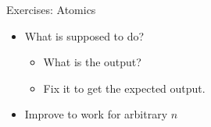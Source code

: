 \documentclass[aspectratio=43]{beamer}
\begin{document}
\begin{frame}[fragile]{Exercises: Atomics}
    \begin{itemize}
        \item What is  supposed to do?
        \begin{itemize}
            \item What is the output?
            \item Fix it to get the expected output.
        \end{itemize}
    \item Improve  to work for arbitrary $n$
    \end{itemize}
\end{frame}


%
\end{document}
